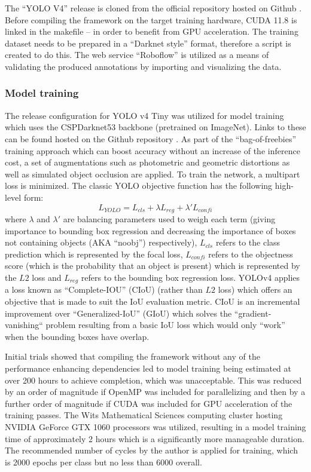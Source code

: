 \documentclass[a4paper,twoside,12pt]{report}
\begin{document}
 The ``YOLO V4'' release is cloned from the official repository hosted on Github \citep{yolov4repo}. Before compiling the framework on the target training hardware, CUDA 11.8 is linked in the makefile -- in order to benefit from GPU acceleration. The training dataset needs to be prepared in a ``Darknet style'' format, therefore a script is created to do this. The web service ``Roboflow'' \citep{roboflow} is utilized as a means of validating the produced annotations by importing and visualizing the data. 

\subsubsection{Model training}

The release configuration for YOLO v4 Tiny was utilized for model training which uses the CSPDarknet53 backbone (pretrained on ImageNet). Links to these can be found hosted on the Github repository \citep{yolov4repo}. As part of the ``bag-of-freebies'' training approach which can boost accuracy without an increase of the inference cost, a set of augmentations such as photometric and geometric distortions as well as simulated object occlusion are applied. To train the network, a multipart loss is minimized. The classic YOLO objective function has the following high-level form:
\begin{equation}
L_{YOLO} =  L_{cls} + \lambda L_{reg} + \lambda' L_{confi} 
\end{equation} 
where $\lambda$ and $\lambda'$ are balancing parameters used to weigh each term (giving importance to bounding box regression and decreasing the importance of boxes not containing objects (AKA ``noobj'') respectively), $L_{cls} $ refers to the class prediction which is represented by the focal loss, $L_{confi}$ refers to the objectness score (which is the probability that an object is present) which is represented by the $L2$ loss and $L_{reg} $ refers to the bounding box regression loss. YOLOv4 applies a loss known as ``Complete-IOU'' (CIoU) \citep{diouloss} (rather than $L2$ loss) which offers an objective that is made to suit the IoU evaluation metric. CIoU is an incremental improvement over ``Generalized-IoU'' (GIoU) \citep{giouloss} which solves the ``gradient-vanishing`` problem resulting from a basic IoU loss which would only ``work'' when the bounding boxes have overlap. 

Initial trials showed that compiling the framework without any of the performance enhancing dependencies led to model training being estimated at over 200 hours to achieve completion, which was unacceptable. This was reduced by an order of magnitude if OpenMP was included for parallelizing and then by a further order of magnitude if CUDA was included for GPU acceleration of the training passes. The Wits Mathematical Sciences computing cluster hosting NVIDIA GeForce GTX 1060 processors was utilized, resulting in a model training time of approximately 2 hours which is a significantly more manageable duration. The recommended number of cycles by the author is applied for training, which is 2000 epochs per class but no less than 6000 overall.
\end{document}
